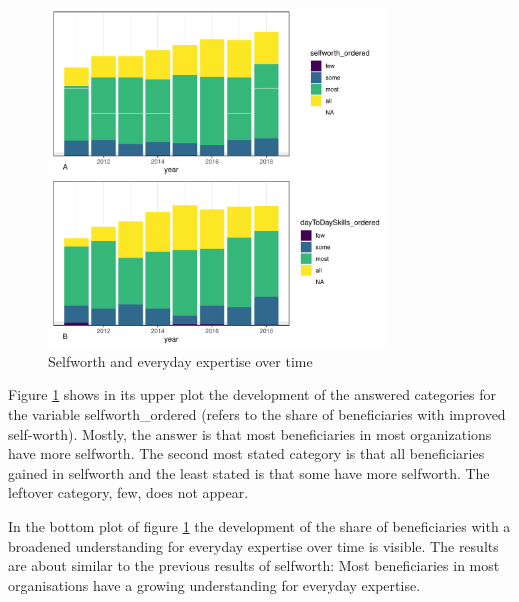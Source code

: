 \documentclass[12pt, a4paper, titlepage]{article}\usepackage[]{graphicx}\usepackage[]{color}
\newenvironment{knitrout}{}{} %
\begin{document}
\begin{figure}
  \caption{Selfworth and everyday expertise over time}
  \label{Equality_timeplots}
\begin{knitrout}
\color{fgcolor}

{\centering \includegraphics[width=0.8\textwidth]{figure/EqualityTimePlots-1} 

}



\end{knitrout}
\end{figure}

Figure \ref{Equality_timeplots} shows in its upper plot the development of the answered categories for the variable selfworth_ordered (refers to the share of beneficiaries with improved self-worth). Mostly, the answer is that most beneficiaries in most organizations have more selfworth. The second most stated category is that all beneficiaries gained in selfworth and the least stated is that some have more selfworth. The leftover category, few, does not appear.

In the bottom plot of figure \ref{Equality_timeplots} the development of the share of beneficiaries with a broadened understanding for everyday expertise over time is visible. The results are about similar to the previous results of selfworth: Most beneficiaries in most organisations have a growing understanding for everyday expertise. 
\end{document}
